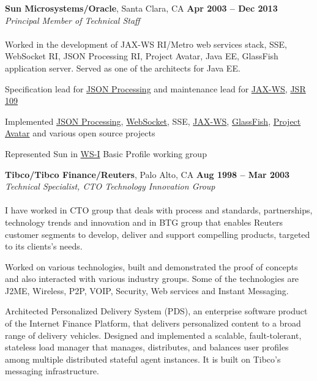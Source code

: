 \documentclass[margin,line]{resume}
\begin{document}
\begin{resume}
    \textbf{Sun Microsystems/Oracle}, Santa Clara, CA \hfill \textbf{Apr 2003 -- Dec 2013}\\ 
    \textsl{Principal Member of Technical Staff}\\\\
Worked in the development of JAX-WS RI/Metro web services stack, SSE, WebSocket RI, JSON Processing RI, Project Avatar, Java EE, GlassFish application server. Served as one of the architects for Java EE.
    \begin{list2}
    \item Specification lead for \href{https://json-processing-spec.java.net}{JSON Processing} and maintenance lead for \href{http://jcp.org/en/jsr/detail?id=224}{JAX-WS}, \href{http://jcp.org/en/jsr/detail?id=109}{JSR 109}
    \item Implemented \href{https://jsonp.java.net}{JSON Processing}, \href{https://tyrus.java.net}{WebSocket}, SSE, \href{https://jax-ws.java.net}{JAX-WS}, \href{https://glassfish.java.net}{GlassFish}, \href{https://avatar.java.net}{Project Avatar} and various open source projects
    \item Represented Sun in \href{http://www.ws-i.org}{WS-I} Basic Profile working group
    \end{list2}\vspace{-1.5mm}


    \textbf{Tibco/Tibco Finance/Reuters}, Palo Alto, CA  \hfill \textbf{Aug 1998 -- Mar 2003}\\
    \textsl{Technical Specialist, CTO Technology Innovation Group}\\\\
I have worked in CTO group that deals with process and standards, partnerships, technology trends and innovation and in BTG group that enables Reuters customer segments to develop, deliver and support compelling products, targeted to its clients's needs.

    \begin{list2}
    \item Worked on various technologies, built and demonstrated the proof of concepts and also interacted with various industry groups. Some of the technologies are J2ME, Wireless, P2P, VOIP, Security, Web services and Instant Messaging.
    \item Architected Personalized Delivery System (PDS), an enterprise software product of the Internet Finance Platform, that delivers personalized content to a broad range of delivery vehicles. Designed and implemented a scalable, fault-tolerant, stateless load manager that manages, distributes, and balances user profiles among multiple distributed stateful agent instances. It is built on Tibco's messaging infrastructure.
    \end{list2}\vspace{-1.5mm}


\end{resume}
\end{document}
